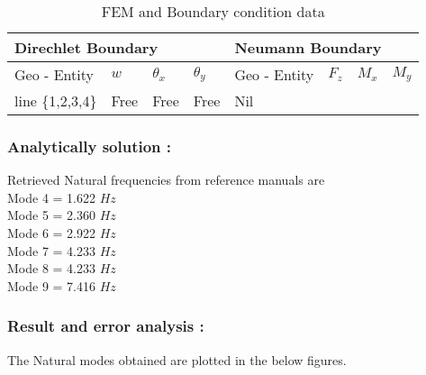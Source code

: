 \documentclass[VM.tex]{subfiles}
\begin{document}
\begin{table}[h!]
\renewcommand{\arraystretch}{1.5}
\centering
\caption{FEM and Boundary condition data}
\begin{tabular}{|l|lll|l|lll|}
\hline
 \multicolumn{4}{l|}{\cellcolor[HTML]{C0C0C0}Direchlet Boundary} & \multicolumn{4}{l|}{\cellcolor[HTML]{C0C0C0}Neumann Boundary} \\ \hline \hline
  Geo - \newline Entity      & $w$          & $\theta _ x$     & $\theta _ y $    & Geo - \newline Entity         & $F_z$        & $M_x$        & $M_y$        \\ \hline
 line \{1,2,3,4\}     & Free  & Free   & Free &Nil                    &         &           &           \\ \hline
\end{tabular}
\end{table}
\subsubsection*{Analytically solution : }
Retrieved Natural frequencies from reference manuals are \\
Mode 4 = 1.622 $Hz$ \\
Mode 5 = 2.360 $Hz$ \\
Mode 6 = 2.922 $Hz$ \\
Mode 7 = 4.233 $Hz$ \\
Mode 8 = 4.233 $Hz$ \\
Mode 9 = 7.416 $Hz$ \\

\subsubsection*{Result and error analysis : }
The Natural modes obtained are plotted in the below figures. 
\end{document}

